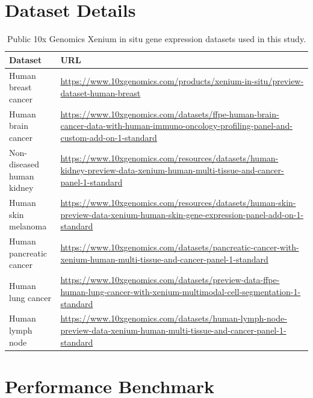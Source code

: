 \documentclass[pdflatex,sn-mathphys-num]{sn-jnl}%
\theoremstyle{thmstyleone}%
\theoremstyle{thmstyletwo}%
\theoremstyle{thmstylethree}%
\begin{document}
\begin{appendices}
\section{Dataset Details}

\begin{table}[!htbp]
\centering
\caption{Public 10x Genomics Xenium in situ gene expression datasets used in this study.}
\label{tab:xenium_datasets}
\begin{tabularx}{\textwidth}{lX}
\hline
\textbf{Dataset} & \textbf{URL} \\
\hline
Human breast cancer &
\url{https://www.10xgenomics.com/products/xenium-in-situ/preview-dataset-human-breast} \\

Human brain cancer &
\url{https://www.10xgenomics.com/datasets/ffpe-human-brain-cancer-data-with-human-immuno-oncology-profiling-panel-and-custom-add-on-1-standard} \\

Non-diseased human kidney &
\url{https://www.10xgenomics.com/resources/datasets/human-kidney-preview-data-xenium-human-multi-tissue-and-cancer-panel-1-standard} \\

Human skin melanoma &
\url{https://www.10xgenomics.com/resources/datasets/human-skin-preview-data-xenium-human-skin-gene-expression-panel-add-on-1-standard} \\

Human pancreatic cancer &
\url{https://www.10xgenomics.com/datasets/pancreatic-cancer-with-xenium-human-multi-tissue-and-cancer-panel-1-standard} \\

Human lung cancer &
\url{https://www.10xgenomics.com/datasets/preview-data-ffpe-human-lung-cancer-with-xenium-multimodal-cell-segmentation-1-standard} \\

Human lymph node &
\url{https://www.10xgenomics.com/datasets/human-lymph-node-preview-data-xenium-human-multi-tissue-and-cancer-panel-1-standard} \\
\hline
\end{tabularx}
\end{table}

\clearpage
\section{Performance Benchmark}

\end{appendices}
\end{document}
